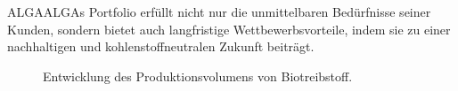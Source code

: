 ALGAALGAs Portfolio erfüllt nicht nur die unmittelbaren Bedürfnisse seiner Kunden, sondern bietet auch langfristige Wettbewerbsvorteile, indem sie zu einer nachhaltigen und kohlenstoffneutralen Zukunft beiträgt.

\begin{figure}[h]
    \centering
    
    \caption[Entwicklung des Produktionsvolumens von Biotreibstoff]{Entwicklung des Produktionsvolumens von Biotreibstoff.}\label{fig:biofuel production}
\end{figure}